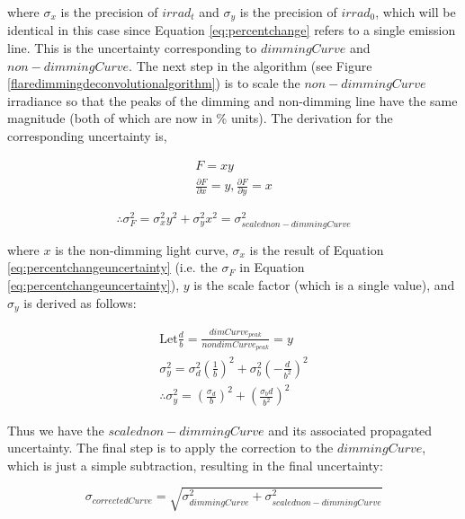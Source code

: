 \noindent where $\sigma _x$ is the precision of $irrad_t$ and $\sigma _y$ is the precision of $irrad_0$, which will be identical in this case since Equation \ref{eq:percentchange} refers to a single emission line. This is the uncertainty corresponding to $dimmingCurve$ and $non-dimmingCurve$. The next step in the algorithm (see Figure \ref{flaredimmingdeconvolutionalgorithm}) is to scale the $non-dimmingCurve$ irradiance so that the peaks of the dimming and non-dimming line have the same magnitude (both of which are now in \% units). The derivation for the corresponding uncertainty is, 

\begin{gather*}
    F = xy \\
    \frac{\partial F}{\partial x} = y , \frac{\partial F}{\partial y} = x
    \label{eq:scaledbrightcurvederivation}
\end{gather*}

\begin{equation}
    \therefore \sigma^2_F = \sigma^2_x y^2 + \sigma^2_y x^2 = \sigma^2_{scalednon-dimmingCurve}
    \label{eq:scaledbrightcurvestep1}
\end{equation}

\noindent where $x$ is the non-dimming light curve, $\sigma _x$ is the result of Equation \ref{eq:percentchangeuncertainty} (i.e. the $\sigma _F$ in Equation \ref{eq:percentchangeuncertainty}), $y$ is the scale factor (which is a single value), and $\sigma _y$ is derived as follows: 

\begin{gather*}
    \text{Let} \frac{d}{b} = \frac{dimCurve_{peak}}{nondimCurve_{peak}} = y \\
    \sigma^2_y = \sigma^2_d(\frac{1}{b})^2 + \sigma^2_b(-\frac{d}{b^2})^2 \\
    \therefore \sigma^2_y = (\frac{\sigma _d}{b})^2 + (\frac{\sigma _bd}{b^2})^2
    \label{eq:scalefactoruncertainty}
\end{gather*}

Thus we have the $scalednon-dimmingCurve$ and its associated propagated uncertainty. The final step is to apply the correction to the $dimmingCurve$, which is just a simple subtraction, resulting in the final uncertainty: 

\begin{equation}
    \sigma _{correctedCurve} = \sqrt{\sigma^2_{dimmingCurve} + \sigma^2_{scalednon-dimmingCurve}}
    \label{eq:correctedcurveuncertainty}
\end{equation}


